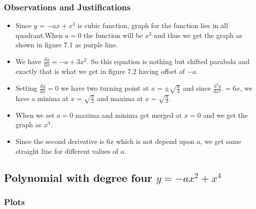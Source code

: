 \documentclass{article}
\begin{document}
\subsubsection{Observations and Justifications}
\begin{itemize}
    \item Since $y$ = $-ax + x^{3}$ is cubic function, graph for the function lies in all quadrant.When $a=0$ the function will be $x^3$ and thus we get the graph as shown in figure 7.1 as purple line.  
    \item We have $\frac{\mathrm{d}y}{\mathrm{d}x} = -a + 3x^2$. So this equation is nothing but shifted parabola and exactly that is what we get in figure 7.2 having offset of $-a$.
    \item Setting $\frac{\mathrm{d}y}{\mathrm{d}x} = 0$ we have two turning point at $x = \pm\sqrt{\frac{a}{3}}$ and since $\frac{\mathrm{d^2}y}{\mathrm{d}x^2} .= 6x$, we have a minima at $x = \sqrt{\frac{a}{3}}$ and maxima at $x = \sqrt{\frac{a}{3}}$.
    \item When we set $a = 0$ maxima and minima get merged at $ x = 0$ and we get the graph as $x^3$.
    \item Since the second derivative is $6x$ which is not depend upon $a$, we get same straight line for different values of $a$.
    
\end{itemize}
\subsection{Polynomial with degree four $y = −ax^{2} + x^{4}$}
\subsubsection{Plots}
\end{document}
